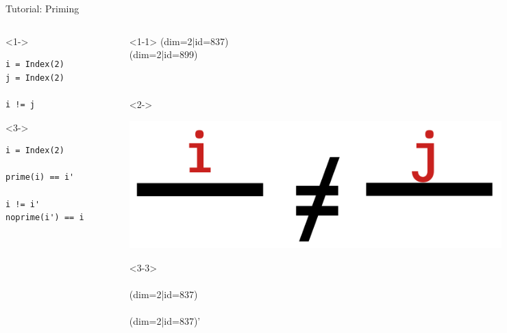 \begin{frame}[fragile]{Tutorial: Priming}

\begin{columns}

\begin{column}{4.5cm}

\begin{onlyenv}<1->
\begin{lstlisting}[language=JuliaLocal, style=julia, mathescape, basicstyle=\scriptsize\ttfamily]
i = Index(2)
j = Index(2)

i != j
\end{lstlisting}
\end{onlyenv}

\begin{onlyenv}<3->
\begin{lstlisting}[language=JuliaLocal, style=julia, mathescape, basicstyle=\scriptsize\ttfamily]
i = Index(2)

prime(i) == i'

i != i'
noprime(i') == i
\end{lstlisting}
\end{onlyenv}

\end{column}

\begin{column}{4.5cm}

\begin{onlyenv}<1-1>
\vspace*{0.05cm}
(dim=2|id=837) \\
(dim=2|id=899) \\
~\\
~\\
\end{onlyenv}

\begin{onlyenv}<2->
\begin{center}
\includegraphics[width=0.8\textwidth]{
  slides/assets/i_neq_j.png
}
\end{center}
\end{onlyenv}

\begin{onlyenv}<3-3>
~\\
~\\
(dim=2|id=837) \\
~\\
(dim=2|id=837)' \\
~\\
~\\
~\\
~\\
\end{onlyenv}


\end{column}
\end{columns}
\end{frame}
